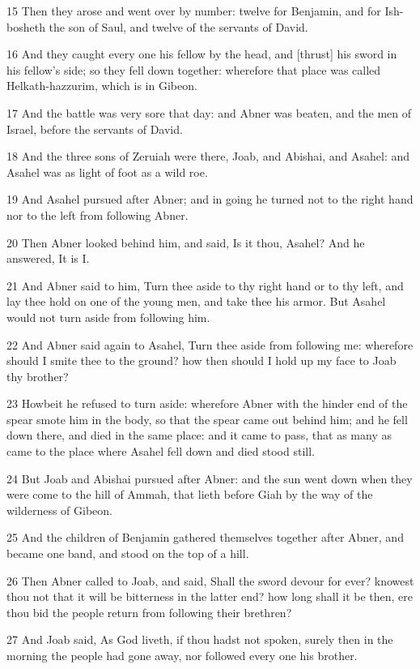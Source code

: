 \par 15 Then they arose and went over by number: twelve for Benjamin, and for Ish-bosheth the son of Saul, and twelve of the servants of David.
\par 16 And they caught every one his fellow by the head, and [thrust] his sword in his fellow's side; so they fell down together: wherefore that place was called Helkath-hazzurim, which is in Gibeon.
\par 17 And the battle was very sore that day: and Abner was beaten, and the men of Israel, before the servants of David.
\par 18 And the three sons of Zeruiah were there, Joab, and Abishai, and Asahel: and Asahel was as light of foot as a wild roe.
\par 19 And Asahel pursued after Abner; and in going he turned not to the right hand nor to the left from following Abner.
\par 20 Then Abner looked behind him, and said, Is it thou, Asahel? And he answered, It is I.
\par 21 And Abner said to him, Turn thee aside to thy right hand or to thy left, and lay thee hold on one of the young men, and take thee his armor. But Asahel would not turn aside from following him.
\par 22 And Abner said again to Asahel, Turn thee aside from following me: wherefore should I smite thee to the ground? how then should I hold up my face to Joab thy brother?
\par 23 Howbeit he refused to turn aside: wherefore Abner with the hinder end of the spear smote him in the body, so that the spear came out behind him; and he fell down there, and died in the same place: and it came to pass, that as many as came to the place where Asahel fell down and died stood still.
\par 24 But Joab and Abishai pursued after Abner: and the sun went down when they were come to the hill of Ammah, that lieth before Giah by the way of the wilderness of Gibeon.
\par 25 And the children of Benjamin gathered themselves together after Abner, and became one band, and stood on the top of a hill.
\par 26 Then Abner called to Joab, and said, Shall the sword devour for ever? knowest thou not that it will be bitterness in the latter end? how long shall it be then, ere thou bid the people return from following their brethren?
\par 27 And Joab said, As God liveth, if thou hadst not spoken, surely then in the morning the people had gone away, nor followed every one his brother.
